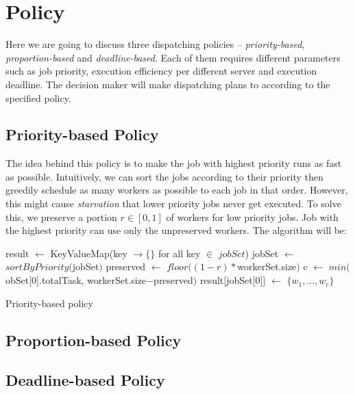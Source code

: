 \chapter{Policy}

Here we are going to discuss three dispatching policies --
\emph{priority-based}, \emph{proportion-based} and
\emph{deadline-based}.  Each of them requires different parameters such
as job priority, execution efficiency per different server and execution
deadline.  The decision maker will make dispatching plans to according
to the specified policy.


\section{Priority-based Policy}

The idea behind this policy is to make the job with highest priority
runs as fast as possible.  Intuitively, we can sort the jobs according
to their priority then greedily schedule as many workers as possible to
each job in that order.  However, this might cause \emph{starvation}
that lower priority jobs never get executed.  To solve this, we preserve
a portion $r \in [0,1]$ of workers for low priority jobs.  Job with the
highest priority can use only the unpreserved workers.  The algorithm
will be:

\begin{algorithm}
  \DontPrintSemicolon %
  result $\gets$ KeyValueMap(key $\to \{\}$ for all key $\in$ $jobSet$)\;
  jobSet $\gets$ $sortByPriority($jobSet$)$\;
  preserved $\gets$ $floor((1-r) * $workerSet.size$)$\;
  c $\gets$ $min($obSet[0].totalTask, workerSet.size$-$preserved$)$\;
  result[jobSet[0]] $\gets$ $\{w_1, ..., w_c\}$\;
  \;
  \label{algo:naive-priority-based}
  \caption{Priority-based policy}
\end{algorithm}

\section{Proportion-based Policy}

\section{Deadline-based Policy}

